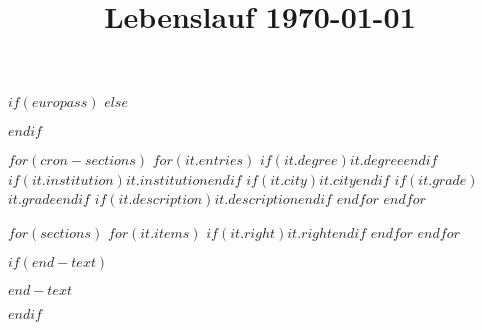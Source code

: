 \documentclass[
$if(europass.nologo)$
  nologo,
$endif$
$if(europass.notitle)$
  notitle,
$endif$
$if(europass.nototpages)$
  nototpages,
$endif$
]{europasscv}
\title{Lebenslauf \today}
\begin{document}
$if(europass)$
\ecvpersonalinfo
$else$
\maketitle
$endif$

$for(cron-sections)$
  $for(it.entries)$
    {$if(it.degree)$$it.degree$$endif$}
    {$if(it.institution)$$it.institution$$endif$}
    {$if(it.city)$$it.city$$endif$}
    {$if(it.grade)$$it.grade$$endif$}
    {$if(it.description)$$it.description$$endif$}
  $endfor$
$endfor$

$for(sections)$
  $for(it.items)$
    {$if(it.right)$$it.right$$endif$}
  $endfor$
$endfor$

$if(end-text)$
\vfill
\begin{center}
\textit{\small $end-text$}
\end{center}
$endif$
\end{document}
